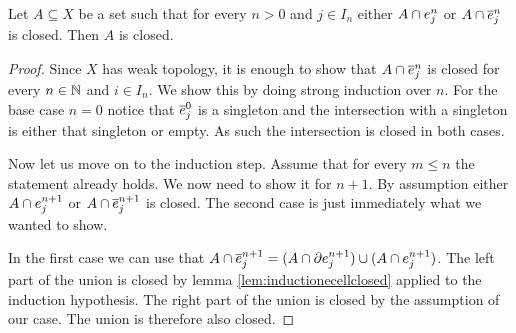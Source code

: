 \begin{lem}
    Let $A \subseteq X$ be a set such that for every $n > 0$ and $j \in I_n$ either $A \cap \ocell{n}{j}$ or $A \cap \ccell{n}{j}$ is closed. 
    Then $A$ is closed.
\end{lem}
\begin{proof}
    Since $X$ has weak topology, it is enough to show that $A \cap \ccell{n}{j}$ is closed for every $n \in \bN$ and $i \in I_n$.
    We show this by doing strong induction over $n$.
    For the base case $n = 0$ notice that $\ccell{0}{j}$ is a singleton and the intersection with a singleton is either that singleton or empty. 
    As such the intersection is closed in both cases.

    Now let us move on to the induction step. 
    Assume that for every $m \le n$ the statement already holds. 
    We now need to show it for $n + 1$.
    By assumption either $A \cap \ocell{n + 1}{j}$ or $A \cap \ccell{n + 1}{j}$ is closed. The second case is just immediately what we wanted to show. 

    In the first case we can use that $A \cap \ccell{n + 1}{j} = (A \cap \ecell{n + 1}{j}) \cup (A \cap \ocell{n + 1}{j})$.
    The left part of the union is closed by lemma \ref{lem:inductionecellclosed} applied to the induction hypothesis. 
    The right part of the union is closed by the assumption of our case. 
    The union is therefore also closed. 
\end{proof}
